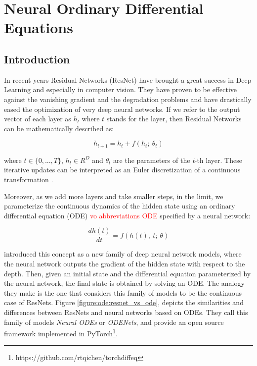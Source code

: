 \chapter{Neural Ordinary Differential Equations}
\label{chapter:ode}

\section{Introduction}
\label{section:ode:introduction}

In recent years Residual Networks (ResNet) \citep{he2016deep} have brought a great success in Deep Learning and especially in computer vision. They have proven to be effective against the vanishing gradient and the degradation problems and have drastically eased the optimization of very deep neural networks. If we refer to the output vector of each layer as $ h_t $ where $ t $ stands for the layer, then Residual Networks can be mathematically described as:

\begin{equation}
    \label{equation:ode:resnet}
    h_{t+1} = h_{t} + f(h_{t}; \ \theta_{t})
\end{equation}

where $ t \in \{0, ..., T\} $, $ h_t \in R^D $ and $ \theta_t $ are the parameters of the \emph{t}-th layer. These iterative updates can be interpreted as an Euler discretization of a continuous transformation \citep{lu2017beyond, haber2017stable, ruthotto2018deep}.

Moreover, as we add more layers and take smaller steps, in the limit, we parameterize the continuous dynamics of the hidden state using an ordinary differential equation (ODE) \textcolor{red}{vo abbreviations ODE} specified by a neural network:

\begin{equation}
    \label{equation:ode:odes}
    \frac{d h(t)}{d t} = f(h(t), \ t; \ \theta )
\end{equation}

\citet{chen2018neural} introduced this concept as a new family of deep neural network models, where the neural network outputs the gradient of the hidden state with respect to the depth. Then, given an initial state and the differential equation parameterized by the neural network, the final state is obtained by solving an ODE. The analogy they make is the one that considers this family of models to be the continuous case of ResNets. Figure \ref{figure:ode:resnet_vs_ode}, depicts the similarities and differences between ResNets and neural networks based on ODEs. They call this family of models \emph{Neural ODEs} or \emph{ODENets}, and provide an open source framework implemented in PyTorch\footnote{https://github.com/rtqichen/torchdiffeq}.

